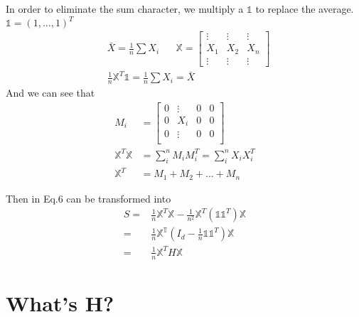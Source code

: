 \documentclass[11pt]{article}
\begin{document}
In order to eliminate the sum character, we multiply a $\mathbb{1}$ to replace the average. $\mathbb{1}=(1,\dots,1)^T$
\begin{align}
  \label{eq3}
  &\bar{X} = \frac{1}{n}\sum X_i \;\;\;\;\;\;
  \mathbb{X} =
  \begin{bmatrix}
    \vdots&\vdots&\vdots\\
    X_1&X_2&X_n\\
    \vdots&\vdots&\vdots
  \end{bmatrix}\\
  &\frac{1}{n}\mathbb{X}^T\mathbb{1}=\frac{1}{n}\sum X_i = \bar{X}
\end{align}
And we can see that
\begin{align}
  M_i &=
  \begin{bmatrix}
    0&\vdots & 0& 0\\
    0&X_i &0&0\\
    0&\vdots&0&0\\
  \end{bmatrix}\\
  \mathbb{X}^T \mathbb{X} &= \sum_i^n M_iM_i^T = \sum_i^nX_iX_i^T\\
  \mathbb{X}^T &= M_1 + M_2 + \dots + M_n
\end{align}

Then in Eq.6 can be transformed into
\begin{align}
  S = & \frac{1}{n}\mathbb{X}^T\mathbb{X} - \frac{1}{n^2}\mathbb{X}^T(\mathbb{1}\mathbb{1}^T)\mathbb{X}\\
  = & \frac{1}{n}\mathbb{X^T}(I_d - \frac{1}{n}\mathbb{1}\mathbb{1}^T)\mathbb{X}\\
  = & \frac{1}{n}\mathbb{X}^TH\mathbb{X}
\end{align}

\section{What's H?}
\end{document}
